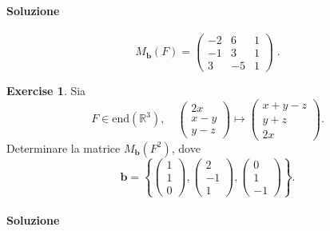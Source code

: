 \documentclass{article}
\theoremstyle{plain}
\theoremstyle{definition}
\newtheorem{xca}[exmp]{Exercise}
\theoremstyle{remark}
\begin{document}
\paragraph{Soluzione}
\[M_\mathbf{b}(F)=
\begin{pmatrix}
    -2&6&1\\
    -1&3&1\\
    3&-5&1
\end{pmatrix}\;.\]

\vspace{10pt}

\begin{bxthm}
\begin{xca}
    Sia 
    \[F\in\mathrm{end}(\mathbb{R}^3),\quad \begin{pmatrix}2x\\x-y\\y-z\end{pmatrix}\mapsto\begin{pmatrix}x+y-z\\y+z\\2x\end{pmatrix}.\]
    Determinare la matrice $M_\mathbf{b}(F^2)$, dove 
    \[\mathbf{b}=\left\{\begin{pmatrix}1\\1\\0\end{pmatrix},\begin{pmatrix}2\\-1\\1\end{pmatrix},\begin{pmatrix}0\\1\\-1\end{pmatrix}\right\}.\]
\end{xca}
\end{bxthm}
\paragraph{Soluzione}


\vspace{10pt}
\end{document}
